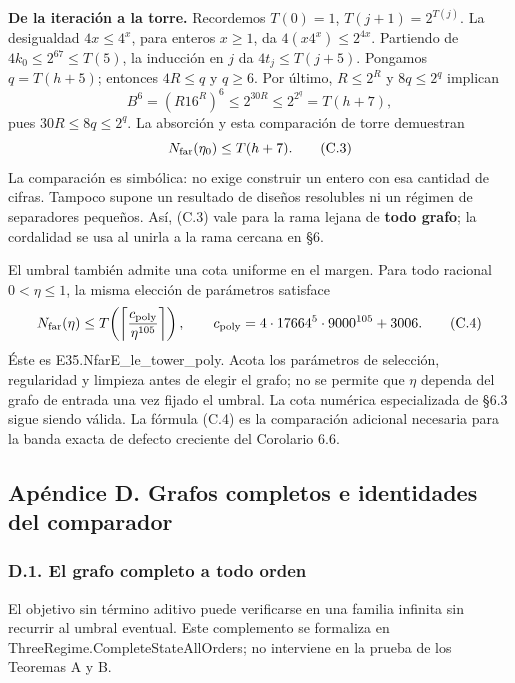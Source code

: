 \documentclass[spanish,11pt,a4paper]{article}
\begin{document}
\textbf{De la iteración a la torre.} Recordemos \(T(0)=1\), \(T(j+1)=2^{T(j)}\). La desigualdad \(4x\le4^x\), para enteros \(x\ge1\), da \(4(x4^x)\le2^{4x}\). Partiendo de \(4k_0\le2^{67}\le T(5)\), la inducción en \(j\) da \(4t_j\le T(j+5)\). Pongamos \(q=T(h+5)\); entonces \(4R\le q\) y \(q\ge6\). Por último, \(R\le2^R\) y \(8q\le2^q\) implican \[
B^6=(R16^R)^6\le2^{30R}\le2^{2^q}=T(h+7),
\] pues \(30R\le8q\le2^q\). La absorción y esta comparación de torre demuestran \[
N_{\rm far}(\eta_0)\le T(h+7).
\tag{C.3}
\] La comparación es simbólica: no exige construir un entero con esa cantidad de cifras. Tampoco supone un resultado de diseños resolubles ni un régimen de separadores pequeños. Así, (C.3) vale para la rama lejana de \textbf{todo grafo}; la cordalidad se usa al unirla a la rama cercana en §6.

El umbral también admite una cota uniforme en el margen. Para todo racional \(0<\eta\le1\), la misma elección de parámetros satisface \[
N_{\rm far}(\eta)\le
T\!\left(\left\lceil\frac{c_{\rm poly}}{\eta^{105}}\right\rceil\right),
\qquad c_{\rm poly}=4\cdot17664^5\cdot9000^{105}+3006.
\tag{C.4}
\] Éste es {\ttfamily\small E35.\discretionary{\hbox{\ensuremath{\hookrightarrow}}}{}{}NfarE\_\discretionary{\hbox{\ensuremath{\hookrightarrow}}}{}{}le\_\discretionary{\hbox{\ensuremath{\hookrightarrow}}}{}{}tower\_\discretionary{\hbox{\ensuremath{\hookrightarrow}}}{}{}poly}. Acota los parámetros de selección, regularidad y limpieza antes de elegir el grafo; no se permite que \(\eta\) dependa del grafo de entrada una vez fijado el umbral. La cota numérica especializada de §6.3 sigue siendo válida. La fórmula (C.4) es la comparación adicional necesaria para la banda exacta de defecto creciente del Corolario 6.6.

\subsection{Apéndice D. Grafos completos e identidades del comparador}\label{apendice-d.-grafos-completos-e-identidades-del-comparador}

\subsubsection{D.1. El grafo completo a todo orden}\label{d.1.-el-grafo-completo-a-todo-orden}

El objetivo sin término aditivo puede verificarse en una familia infinita sin recurrir al umbral eventual. Este complemento se formaliza en {\ttfamily\small ThreeRegime.\discretionary{\hbox{\ensuremath{\hookrightarrow}}}{}{}CompleteStat\discretionary{\hbox{\ensuremath{\hookrightarrow}}}{}{}eAllOrders}; no interviene en la prueba de los Teoremas A y B.
\end{document}
